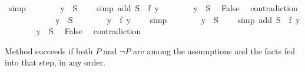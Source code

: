 \begin{isabellebody}
\ simp\isanewline
\ \ \ \ \ \ \isamarkupfalse%
\ {}y\ {}\ {}S{}\ \ \ \ \isamarkupfalse%
{}simp\ add{}\ {}{}S\ {}\ f\ y{}{}\isanewline
\ \ \ \ \ \ \isamarkupfalse%
\ {}y\ {}\ {}S{}\ \isamarkupfalse%
\ False\ \isamarkupfalse%
\ contradiction\isanewline
\ \ \ \ \isamarkupfalse%
\isanewline
\ \ \ \ \ \ \isamarkupfalse%
\ {}y\ {}\ {}S{}\isanewline
\ \ \ \ \ \ \isamarkupfalse%
\ {}y\ {}\ f\ y{}\ \ \ \isamarkupfalse%
\ simp\isanewline
\ \ \ \ \ \ \isamarkupfalse%
\ {}y\ {}\ {}S{}\ \ \ \ \isamarkupfalse%
{}simp\ add{}\ {}{}S\ {}\ f\ y{}{}\isanewline
\ \ \ \ \ \ \isamarkupfalse%
\ {}y\ {}\ {}S{}\ \isamarkupfalse%
\ False\ \isamarkupfalse%
\ contradiction\isanewline
\ \ \ \ \isamarkupfalse%
\isanewline
\ \ \isamarkupfalse%
\isanewline
{}\isamarkupfalse%
%
\endisatagproof
{\isafoldproof}%
%
\isadelimproof
%
\endisadelimproof
%
\begin{isamarkuptext}%
\noindent Method  succeeds if both $P$ and
$\neg P$ are among the assumptions and the facts fed into that step, in any order.


\end{isamarkuptext}
\end{isabellebody}
